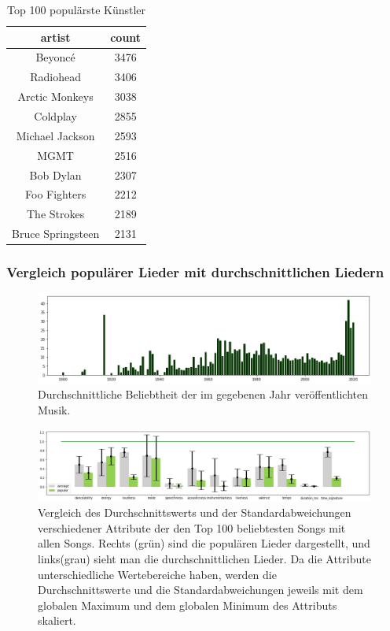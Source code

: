 \documentclass[conference]{IEEEtran}
\begin{document}
\begin{table}[h]
\centering
\begin{tabular}{c c} 
\hline
artist & count \\ [0.5ex] 
\hline
Beyoncé & 3476 \\ 
Radiohead & 3406 \\ 
Arctic Monkeys & 3038 \\ 
Coldplay & 2855 \\ 
Michael Jackson & 2593 \\ 
MGMT & 2516 \\ 
Bob Dylan & 2307 \\ 
Foo Fighters & 2212 \\ 
The Strokes & 2189 \\ 
Bruce Springsteen & 2131 \\ [1ex] 
\hline
\end{tabular}
\caption{Top 100 populärste Künstler}
\label{tab:topartists}
\end{table}
\subsubsection{Vergleich populärer Lieder mit durchschnittlichen Liedern}

\begin{figure}[t]
\centering
\includegraphics[width=\textwidth]{images/popularity_per_year.png}
\caption{Durchschnittliche Beliebtheit der im gegebenen Jahr veröffentlichten Musik.}
\label{popularity_time}
\end{figure}

\begin{figure}[t]
\centering
\includegraphics[width=\textwidth]{images/pop_tracks.png}
\caption{Vergleich des Durchschnittswerts und der Standardabweichungen verschiedener Attribute der den Top 100 beliebtesten Songs mit allen Songs. Rechts (grün) sind die populären Lieder dargestellt, und links(grau) sieht man die durchschnittlichen Lieder. Da die Attribute unterschiedliche Wertebereiche haben, werden die Durchschnittswerte und die Standardabweichungen jeweils mit dem globalen Maximum und dem globalen Minimum des Attributs skaliert.}
\label{popular tracks}
\end{figure}
\end{document}
